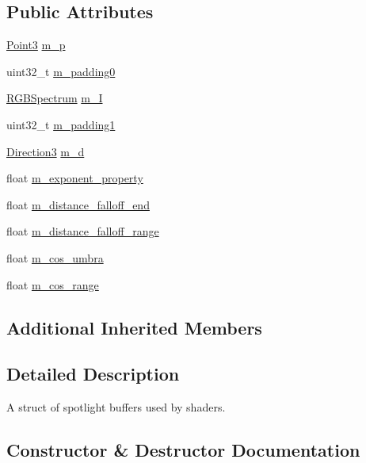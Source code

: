 \subsection*{Public Attributes}
\begin{DoxyCompactItemize}
\item 
\hyperlink{structmage_1_1_point3}{Point3} \hyperlink{structmage_1_1_spot_light_buffer_a6cb32b6089b90aa937df99bb794884e3}{m\+\_\+p}
\item 
uint32\+\_\+t \hyperlink{structmage_1_1_spot_light_buffer_a8a5110d1427ca192cee7751ae8aeabab}{m\+\_\+padding0}
\item 
\hyperlink{structmage_1_1_r_g_b_spectrum}{R\+G\+B\+Spectrum} \hyperlink{structmage_1_1_spot_light_buffer_a778a729e75ff4074fc5aede42f551ab2}{m\+\_\+I}
\item 
uint32\+\_\+t \hyperlink{structmage_1_1_spot_light_buffer_a60369775901f4536a28cc35ab2275bd8}{m\+\_\+padding1}
\item 
\hyperlink{structmage_1_1_direction3}{Direction3} \hyperlink{structmage_1_1_spot_light_buffer_aaa8d493a4bc458040588561c76547b97}{m\+\_\+d}
\item 
float \hyperlink{structmage_1_1_spot_light_buffer_a272cd27ceece27883b9607b8fff2160c}{m\+\_\+exponent\+\_\+property}
\item 
float \hyperlink{structmage_1_1_spot_light_buffer_ae49f16cc01db734c72f02c963d89d0c2}{m\+\_\+distance\+\_\+falloff\+\_\+end}
\item 
float \hyperlink{structmage_1_1_spot_light_buffer_ad1f33d97b665093294fa0793bc7752f0}{m\+\_\+distance\+\_\+falloff\+\_\+range}
\item 
float \hyperlink{structmage_1_1_spot_light_buffer_a7a7a02e7ddfaf96c90395cd21a6c0a91}{m\+\_\+cos\+\_\+umbra}
\item 
float \hyperlink{structmage_1_1_spot_light_buffer_a09bf487f32c19e494a47fd03137e1bc1}{m\+\_\+cos\+\_\+range}
\end{DoxyCompactItemize}
\subsection*{Additional Inherited Members}


\subsection{Detailed Description}
A struct of spotlight buffers used by shaders. 

\subsection{Constructor \& Destructor Documentation}
\hypertarget{structmage_1_1_spot_light_buffer_a862141be0a9dfe1fd3117141924650d5}{}\label{structmage_1_1_spot_light_buffer_a862141be0a9dfe1fd3117141924650d5} 
